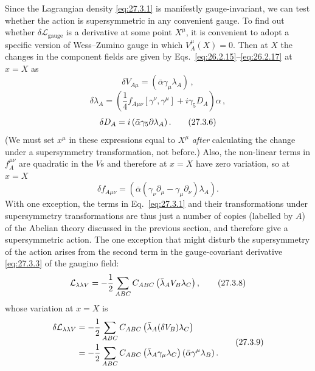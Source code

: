 Since the Lagrangian density \eqref{eq:27.3.1} is manifestly
gauge-invariant, we can test whether the action is supersymmetric in any
convenient gauge. To find out whether
\(\delta\mathcal{L}_{\mathrm{gauge}}\) is a derivative at some point
\(X^\mu\), it is convenient to adopt a specific version of Wess--Zumino
gauge in which \(V_A^\mu(X)=0\). Then at \(X\) the changes in the component
fields are given by Eqs.~\eqref{eq:26.2.15}--\eqref{eq:26.2.17} at \(x=X\)
as
\begin{equation}
  \delta V_{A\mu}=(\bar\alpha\gamma_\mu\lambda_A)\,,
  \tag{27.3.4}\label{eq:27.3.4}
\end{equation}
\begin{equation}
  \delta\lambda_A
  =\left(
    \frac14 f_{A\mu\nu}[\gamma^\nu,\gamma^\mu]
    +i\gamma_5D_A
  \right)\alpha\,,
  \tag{27.3.5}\label{eq:27.3.5}
\end{equation}
\begin{equation}
  \delta D_A=i\left(\bar\alpha\gamma_5\sl{\partial}\lambda_A\right).
  \tag{27.3.6}\label{eq:27.3.6}
\end{equation}
(We must set \(x^\mu\) in these expressions equal to \(X^\mu\)
\textit{after} calculating the change under a supersymmetry transformation,
not before.) Also, the non-linear terms in \(f_A^{\mu\nu}\) are quadratic
in the \(V\)s and therefore at \(x=X\) have zero variation, so at \(x=X\)
\begin{equation}
  \delta f_{A\mu\nu}
  =\left(\bar\alpha
    (\gamma_\nu\partial_\mu-\gamma_\mu\partial_\nu)\lambda_A
  \right).
  \tag{27.3.7}\label{eq:27.3.7}
\end{equation}
With one exception, the terms in Eq.~\eqref{eq:27.3.1} and their
transformations under supersymmetry transformations are thus just a number
of copies (labelled by \(A\)) of the Abelian theory discussed in the
previous section, and therefore give a supersymmetric action. The one
exception that might disturb the supersymmetry of the action arises from
the second term in the gauge-covariant derivative \eqref{eq:27.3.3} of the
gaugino field:
\begin{equation}
  \mathcal{L}_{\lambda\lambda V}
  =-\frac12\sum_{ABC}C_{ABC}
    \left(\bar\lambda_A\sl{V}_B\lambda_C\right),
  \tag{27.3.8}\label{eq:27.3.8}
\end{equation}
whose variation at \(x=X\) is
\begin{equation}
  \begin{aligned}
  \delta\mathcal{L}_{\lambda\lambda V}
  &=-\frac12\sum_{ABC}C_{ABC}
    \left(\bar\lambda_A(\delta\sl{V}_B)\lambda_C\right)
  \\
  &=-\frac12\sum_{ABC}C_{ABC}
    \left(\bar\lambda_A\gamma_\mu\lambda_C\right)
    \left(\bar\alpha\gamma^\mu\lambda_B\right).
  \end{aligned}
  \tag{27.3.9}\label{eq:27.3.9}
\end{equation}
